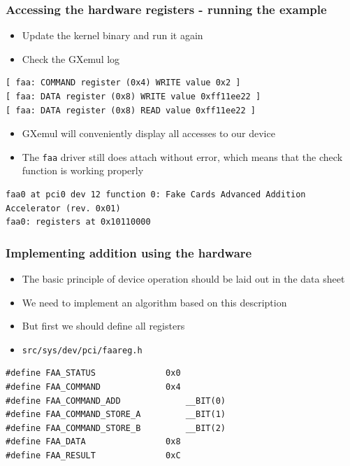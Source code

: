 \documentclass[dvipsnames,table]{beamer}
\begin{document}
\begin{frame}[fragile]
\frametitle{Accessing the hardware registers - running the example}
\begin{itemize}
	\item Update the kernel binary and run it again
	\item Check the GXemul log
\end{itemize}
\begin{verbatim}
[ faa: COMMAND register (0x4) WRITE value 0x2 ]
[ faa: DATA register (0x8) WRITE value 0xff11ee22 ]
[ faa: DATA register (0x8) READ value 0xff11ee22 ]
\end{verbatim}
\begin{itemize}
	\item GXemul will conveniently display all accesses to our device
	\item The {\tt faa} driver still does attach without error, which means that the check function is working properly
\end{itemize}
\tiny
\begin{verbatim}
faa0 at pci0 dev 12 function 0: Fake Cards Advanced Addition Accelerator (rev. 0x01)
faa0: registers at 0x10110000
\end{verbatim}
\end{frame}

\begin{frame}[fragile]
\frametitle{Implementing addition using the hardware}
\begin{itemize}
	\item The basic principle of device operation should be laid out in the data sheet
	\item We need to implement an algorithm based on this description \hyperlink{faaop}{}


	\item But first we should define all registers
	\item {\tt src/sys/dev/pci/faareg.h}
\end{itemize}
\begin{lstlisting}
#define FAA_STATUS              0x0
#define FAA_COMMAND             0x4
#define FAA_COMMAND_ADD             __BIT(0)        
#define FAA_COMMAND_STORE_A         __BIT(1)
#define FAA_COMMAND_STORE_B         __BIT(2)
#define FAA_DATA                0x8
#define FAA_RESULT              0xC
\end{lstlisting}


\end{frame}
\end{document}
